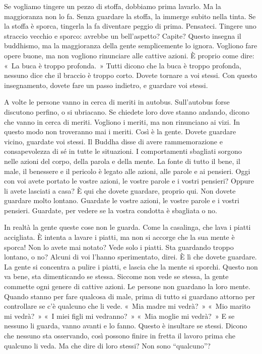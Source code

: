 
Se vogliamo tingere un pezzo di stoffa, dobbiamo prima lavarlo. Ma la
maggioranza non lo fa. Senza guardare la stoffa, la immerge subito nella
tinta. Se la stoffa è sporca, tingerla la fa diventare peggio di prima.
Pensateci. Tingere uno straccio vecchio e sporco: avrebbe un
bell'aspetto? Capite? Questo insegna il buddhismo, ma la maggioranza
della gente semplicemente lo ignora. Vogliono fare opere buone, ma non
vogliono rinunciare alle cattive azioni. È proprio come dire: «~La buca
è troppo profonda.~» Tutti dicono che la buca è troppo profonda, nessuno
dice che il braccio è troppo corto. Dovete tornare a voi stessi. Con
questo insegnamento, dovete fare un passo indietro, e guardare voi
stessi.

A volte le persone vanno in cerca di meriti in autobus. Sull'autobus
forse discutono perfino, o si ubriacano. Se chiedete loro dove stanno
andando, dicono che vanno in cerca di meriti. Vogliono i meriti, ma non
rinunciano ai vizi. In questo modo non troveranno mai i meriti. Così è
la gente. Dovete guardare vicino, guardate voi stessi. Il Buddha disse
di avere rammemorazione e consapevolezza di sé in tutte le situazioni. I
comportamenti sbagliati sorgono nelle azioni del corpo, della parola e
della mente. La fonte di tutto il bene, il male, il benessere e il
pericolo è legato alle azioni, alle parole e ai pensieri. Oggi con voi
avete portato le vostre azioni, le vostre parole e i vostri pensieri?
Oppure li avete lasciati a casa? È qui che dovete guardare, proprio qui.
Non dovete guardare molto lontano. Guardate le vostre azioni, le vostre
parole e i vostri pensieri. Guardate, per vedere se la vostra condotta è
sbagliata o no.

In realtà la gente queste cose non le guarda. Come la casalinga, che
lava i piatti accigliata. È intenta a lavare i piatti, ma non si accorge
che la sua mente è sporca! Non lo avete mai notato? Vede solo i piatti.
Sta guardando troppo lontano, o no? Alcuni di voi l'hanno sperimentato,
direi. È lì che dovete guardare. La gente si concentra a pulire i
piatti, e lascia che la mente si sporchi. Questo non va bene, sta
dimenticando se stessa. Siccome non vede se stessa, la gente commette
ogni genere di cattive azioni. Le persone non guardano la loro mente.
Quando stanno per fare qualcosa di male, prima di tutto si guardano
attorno per controllare se c'è qualcuno che li vede. «~Mia madre mi
vedrà?~» «~Mio marito mi vedrà?~» «~I miei figli mi vedranno?~» «~Mia
moglie mi vedrà?~» E se nessuno li guarda, vanno avanti e lo fanno.
Questo è insultare se stessi. Dicono che nessuno sta osservando, così
possono finire in fretta il lavoro prima che qualcuno li veda. Ma che
dire di loro stessi? Non sono ``qualcuno''?

